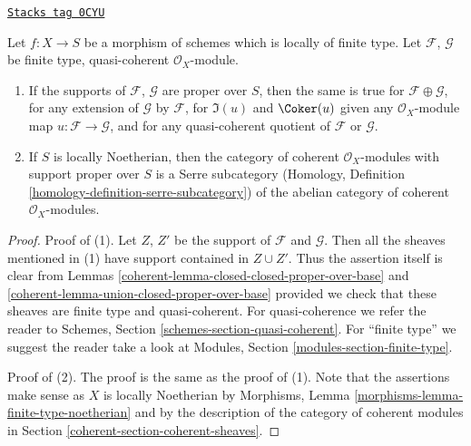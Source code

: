 \begin{lemma}
\label{coherent-lemma-cat-module-support-proper-over-base}
\href{https://stacks.math.columbia.edu/tag/0CYU}{\texttt{Stacks tag 0CYU}}

Let $f : X \to S$ be a morphism of schemes which is locally
of finite type. Let $\mathcal{F}$, $\mathcal{G}$
be finite type, quasi-coherent $\mathcal{O}_X$-module.
\begin{enumerate}
\item If the supports of $\mathcal{F}$, $\mathcal{G}$
are proper over $S$, then the same is true
for $\mathcal{F} \oplus \mathcal{G}$, for any extension
of $\mathcal{G}$ by $\mathcal{F}$, for $\Im(u)$ and $\Coker(u)$
given any $\mathcal{O}_X$-module map $u : \mathcal{F} \to \mathcal{G}$,
and for any quasi-coherent quotient of $\mathcal{F}$ or $\mathcal{G}$.
\item If $S$ is locally Noetherian, then the category of
coherent $\mathcal{O}_X$-modules with support proper over
$S$ is a Serre subcategory (Homology, Definition
\ref{homology-definition-serre-subcategory})
of the abelian category of
coherent $\mathcal{O}_X$-modules.
\end{enumerate}
\end{lemma}

\begin{proof}

Proof of (1). Let $Z$, $Z'$ be the support of $\mathcal{F}$
and $\mathcal{G}$. Then all the sheaves mentioned in (1)
have support contained in $Z \cup Z'$. Thus the assertion itself
is clear from Lemmas \ref{coherent-lemma-closed-closed-proper-over-base} and
\ref{coherent-lemma-union-closed-proper-over-base}
provided we check that these sheaves are finite type
and quasi-coherent. For quasi-coherence we refer the reader to
Schemes, Section \ref{schemes-section-quasi-coherent}.
For ``finite type'' we suggest the reader take a look at
Modules, Section \ref{modules-section-finite-type}.

\medskip\noindent
Proof of (2). The proof is the same as the proof of (1). Note that
the assertions make sense as $X$ is locally Noetherian by
Morphisms, Lemma \ref{morphisms-lemma-finite-type-noetherian}
and by the description of the category of coherent
modules in Section \ref{coherent-section-coherent-sheaves}.
\end{proof}

